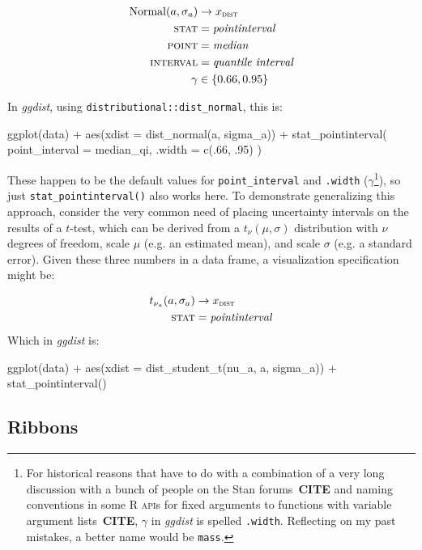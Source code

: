 \documentclass[journal]{vgtc}                     %
\newenvironment{centerverbatim}{%
  \hfill\break
  \small
  \centering
  \varwidth{\linewidth}%
  \verbatim
}{%
  \endverbatim
  \endvarwidth
  \par
  \hfill\break
}
\begin{document}
\begin{align*}
\operatorname{Normal}(a, \sigma_a) &\rightarrow x_\textsc{dist}\\
\textsc{stat} &= \mathit{pointinterval}\\
\textsc{point} &= \mathit{median}\\
\textsc{interval} &= \textit{quantile interval}\\
\gamma &\in \{0.66, 0.95\}
\end{align*}

In \textit{ggdist}, using \texttt{distributional::dist\_normal}, this is:

\begin{centerverbatim}
ggplot(data) +
  aes(xdist = dist_normal(a, sigma_a)) +
  stat_pointinterval(
    point_interval = median_qi, 
    .width = c(.66, .95)
  )
\end{centerverbatim}

These happen to be the default values for \texttt{point\_interval} and \texttt{.width} ($\gamma$\footnote{For historical reasons that have to do with a combination of a very long discussion with a bunch of people on the Stan forums~\textbf{CITE} and naming conventions in some R \textsc{api}s for fixed arguments to functions with variable argument lists~\textbf{CITE}, $\gamma$ in \textit{ggdist} is spelled \texttt{.width}. Reflecting on my past mistakes, a better name would be  \texttt{mass}.}), so just \texttt{stat\_pointinterval()}  also works here. To demonstrate generalizing this approach, consider the very common need of placing uncertainty intervals on the results of a $t$-test, which can be derived from a $t_\nu(\mu, \sigma)$  distribution with $\nu$ degrees of freedom, scale $\mu$ (e.g. an estimated mean), and scale $\sigma$ (e.g. a standard error). Given these three numbers in a data frame, a visualization specification might be:


\begin{align*}
t_{\nu_a}(a, \sigma_a) &\rightarrow x_\textsc{dist}\\
\textsc{stat} &= \mathit{pointinterval}
\end{align*}
Which in \textit{ggdist} is:

\begin{centerverbatim}
ggplot(data) +
  aes(xdist = dist_student_t(nu_a, a, sigma_a)) +
  stat_pointinterval()
\end{centerverbatim}

\subsection{Ribbons}
\end{document}
